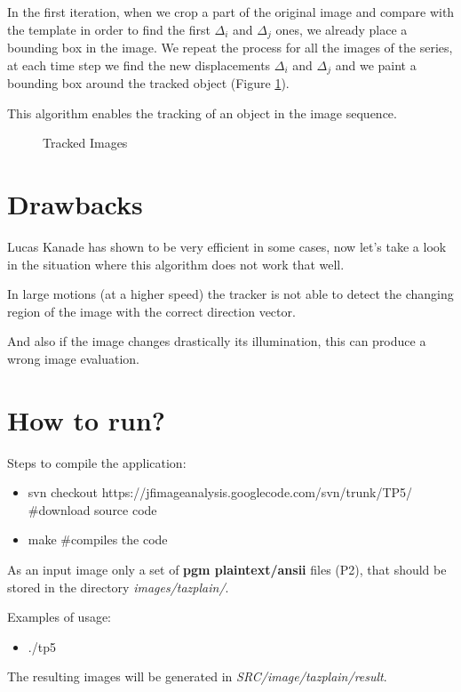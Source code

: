\documentclass{article}
\begin{document}
	In the first iteration, when we crop a part of the original image and compare with the template in order to find the first $\Delta_i$ and $\Delta_j$ ones, we already place a bounding box in the image. We repeat the process for all the images of the series, at each time step we find the new displacements $\Delta_i$ and $\Delta_j$ and we paint a bounding box around the tracked object (Figure \ref{fig:tracked}). 

	This algorithm enables the tracking of an object in the image sequence.

\begin{figure}[H]
\centering
{}
		  \hspace{0.1cm}
		  \hspace{0.1cm}
\caption{Tracked Images}
\label{fig:tracked}
\end{figure}	


\section{Drawbacks}

Lucas Kanade has shown to be very efficient in some cases, now let's take a look in the situation where this algorithm does not work that well.

In large motions (at a higher speed) the tracker is not able to detect the changing region of the image with the correct direction vector.

And also if the image changes drastically its illumination, this can produce a wrong image evaluation.


\section{How to run?}

	Steps to compile the application:
	
	\begin{itemize}
		\item svn checkout https://jfimageanalysis.googlecode.com/svn/trunk/TP5/ \#download source code
		\item make \#compiles the code
	\end{itemize}

	As an input image only a set of {\bf pgm plaintext/ansii} files (P2), that should be stored in the directory \emph{images/tazplain/}. 

	Examples of usage:

	\begin{itemize}
		\item ./tp5
	\end{itemize}

	The resulting images will be generated in \emph{SRC/image/tazplain/result}.
\end{document}
